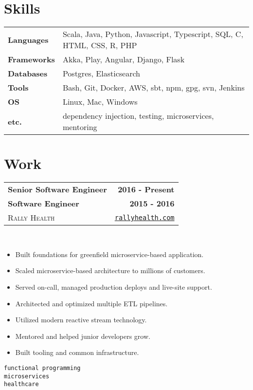 \documentclass[10pt,letterpaper]{article}
\newenvironment{details}
{\begin{itemize}}
{\end{itemize}}
\begin{document}
  \setcounter{secnumdepth}{0}

  \section{Skills}

  \noindent
  \begin{tabularx}{\textwidth}{@{}lX@{}}
    \textbf{Languages} & Scala, Java, Python, Javascript, Typescript, SQL, C, HTML, CSS, R, PHP \\
    \textbf{Frameworks} & Akka, Play, Angular, Django, Flask \\
    \textbf{Databases} & Postgres, Elasticsearch \\
    \textbf{Tools} & Bash, Git, Docker, AWS, sbt, npm, gpg, svn, Jenkins \\
    \textbf{OS} & Linux, Mac, Windows \\
    \textbf{etc.} & dependency injection, testing, microservices, mentoring
  \end{tabularx}

  \section{Work}

  \noindent\begin{tabularx}{\textwidth}{@{}X r@{}}
    \textbf{Senior Software Engineer} & \textbf{2016 - Present} \\
    \textbf{Software Engineer} & \textbf{2015 - 2016} \\
    \textsc{Rally Health} & \texttt{\href{http://rallyhealth.com}{rallyhealth.com}}
  \end{tabularx}
  \hfill\\
  \noindent\begin{minipage}[t]{\dimexpr.7\textwidth-.7\columnsep}
    \raggedright
    \begin{details}
    \item Built foundations for greenfield microservice-based application.
    \item Scaled microservice-based architecture to millions of customers.
    \item Served on-call, managed production deploys and live-site support.
    \item Architected and optimized multiple ETL pipelines.
    \item Utilized modern reactive stream technology.
    \item Mentored and helped junior developers grow.
    \item Built tooling and common infrastructure.
    \end{details}
  \end{minipage}%
  \begin{minipage}[t]{\dimexpr.32\textwidth-.32\columnsep}
    \raggedleft
    \texttt{functional programming} \\
    \texttt{microservices} \\
    \texttt{healthcare}
  \end{minipage}
\end{document}

